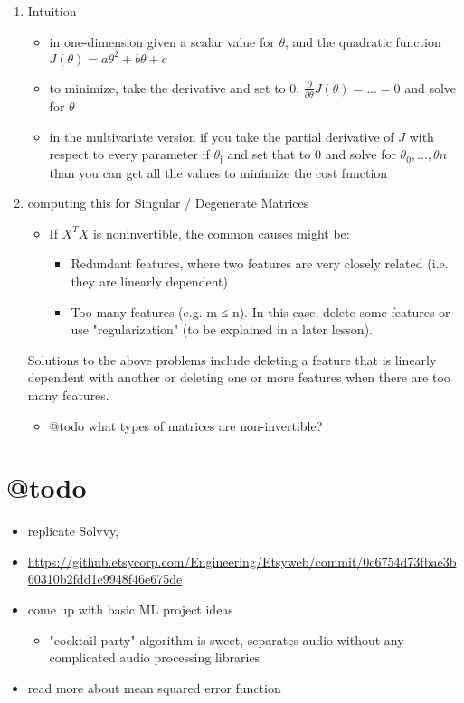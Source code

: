 \documentclass[11pt]{article}
\begin{document}
\begin{enumerate}
\item Intuition
\label{sec:org2cc9971}
\begin{itemize}
\item in one-dimension given a scalar value for \(\theta\), and the quadratic function \(J(\theta)=a\theta^{2}+b\theta+c\)
\item to minimize, take the derivative and set to 0, \(\frac{\partial}{\partial\theta}J(\theta)= ... = 0\) and solve for \(\theta\)
\item in the multivariate version if you take the partial derivative of
\(J\) with respect to every parameter if \(\theta_{\text{j}}\) and set that to
\(0\) and solve for \(\theta_{0},...,\theta{n}\) than you can get
all the values to minimize the cost function
\end{itemize}









\item computing this for Singular / Degenerate Matrices
\label{sec:org2aa3245}
\begin{itemize}
\item If \(X^{T}X\) is noninvertible, the common causes might be:
\begin{itemize}
\item Redundant features, where two features are very closely related (i.e. they are linearly dependent)
\item Too many features (e.g. m ≤ n). In this case, delete some features or use "regularization" (to be explained in a later lesson).
\end{itemize}
\end{itemize}
Solutions to the above problems include deleting a feature that is linearly dependent with another or deleting one or more features when there are too many features.
\begin{itemize}
\item @todo what types of matrices are non-invertible?
\end{itemize}
\end{enumerate}
\section{@todo}
\label{sec:org0a89b6c}
\begin{itemize}
\item replicate Solvvy,
\item \url{https://github.etsycorp.com/Engineering/Etsyweb/commit/0c6754d73fbae3b60310b2fdd1e9948f46e675de}

\item come up with basic ML project ideas
\begin{itemize}
\item "cocktail party" algorithm is sweet, separates audio without any
complicated audio processing libraries
\end{itemize}
\item read more about mean squared error function
\end{itemize}
\end{document}
